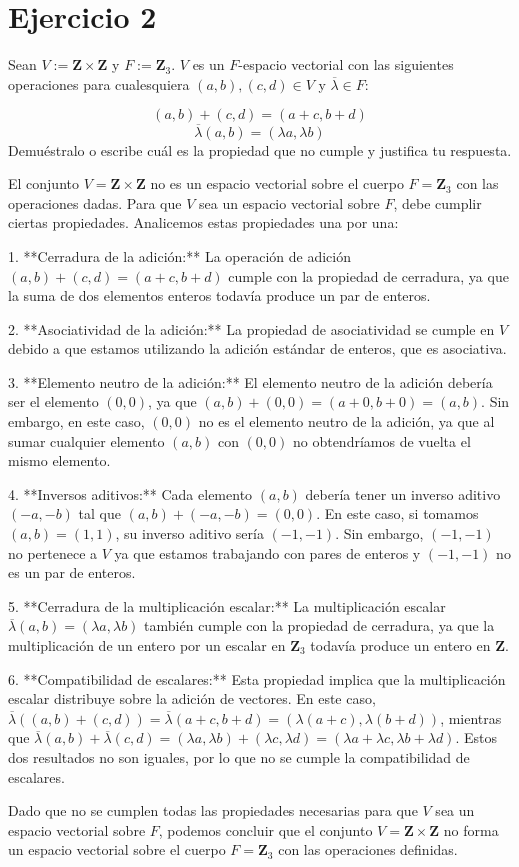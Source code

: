 \section*{Ejercicio 2}
Sean $V := \mathbf{Z} \times \mathbf{Z}$ y $F := \mathbf{Z}_{3}$. $V$ es un $F$-espacio vectorial con las siguientes operaciones para cualesquiera $(a,b), (c,d) \in V$ y $\overline{\lambda} \in F$:

$$(a,b) + (c,d) = (a+c, b+d)$$
$$\overline{\lambda}(a,b) = (\lambda a, \lambda b)$$
Demuéstralo o escribe cuál es la propiedad que no cumple y justifica tu respuesta.



El conjunto $V = \mathbf{Z} \times \mathbf{Z}$ no es un espacio vectorial sobre el cuerpo $F = \mathbf{Z}_3$ con las operaciones dadas. Para que $V$ sea un espacio vectorial sobre $F$, debe cumplir ciertas propiedades. Analicemos estas propiedades una por una:

1. **Cerradura de la adición:** La operación de adición $(a,b) + (c,d) = (a+c, b+d)$ cumple con la propiedad de cerradura, ya que la suma de dos elementos enteros todavía produce un par de enteros.

2. **Asociatividad de la adición:** La propiedad de asociatividad se cumple en $V$ debido a que estamos utilizando la adición estándar de enteros, que es asociativa.

3. **Elemento neutro de la adición:** El elemento neutro de la adición debería ser el elemento $(0,0)$, ya que $(a,b) + (0,0) = (a+0, b+0) = (a,b)$. Sin embargo, en este caso, $(0,0)$ no es el elemento neutro de la adición, ya que al sumar cualquier elemento $(a,b)$ con $(0,0)$ no obtendríamos de vuelta el mismo elemento.

4. **Inversos aditivos:** Cada elemento $(a,b)$ debería tener un inverso aditivo $(-a, -b)$ tal que $(a,b) + (-a,-b) = (0,0)$. En este caso, si tomamos $(a,b) = (1,1)$, su inverso aditivo sería $(-1,-1)$. Sin embargo, $(-1, -1)$ no pertenece a $V$ ya que estamos trabajando con pares de enteros y $(-1,-1)$ no es un par de enteros.

5. **Cerradura de la multiplicación escalar:** La multiplicación escalar $\overline{\lambda}(a,b) = (\lambda a, \lambda b)$ también cumple con la propiedad de cerradura, ya que la multiplicación de un entero por un escalar en $\mathbf{Z}_3$ todavía produce un entero en $\mathbf{Z}$.

6. **Compatibilidad de escalares:** Esta propiedad implica que la multiplicación escalar distribuye sobre la adición de vectores. En este caso, $\overline{\lambda}((a,b) + (c,d)) = \overline{\lambda}(a+c, b+d) = (\lambda(a+c), \lambda(b+d))$, mientras que $\overline{\lambda}(a,b) + \overline{\lambda}(c,d) = (\lambda a, \lambda b) + (\lambda c, \lambda d) = (\lambda a + \lambda c, \lambda b + \lambda d)$. Estos dos resultados no son iguales, por lo que no se cumple la compatibilidad de escalares.

Dado que no se cumplen todas las propiedades necesarias para que $V$ sea un espacio vectorial sobre $F$, podemos concluir que el conjunto $V = \mathbf{Z} \times \mathbf{Z}$ no forma un espacio vectorial sobre el cuerpo $F = \mathbf{Z}_3$ con las operaciones definidas.
